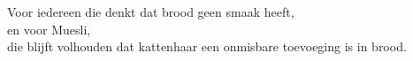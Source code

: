 \begin{dedication}
  ~\\
  ~\\
  ~\\
  ~\\
  ~\\
	Voor iedereen die denkt dat brood geen smaak heeft, \\
	en voor Muesli, \\
  die blijft volhouden dat kattenhaar een onmisbare toevoeging is in brood. 
\end{dedication}

\endgroup
\clearpage


\pagestyle{empty}

\renewcommand*\contentsname{Inhoudsopgave}
{
  \setcounter{tocdepth}{2}
  \tableofcontents*
}

\clearpage
\pagestyle{desem}

